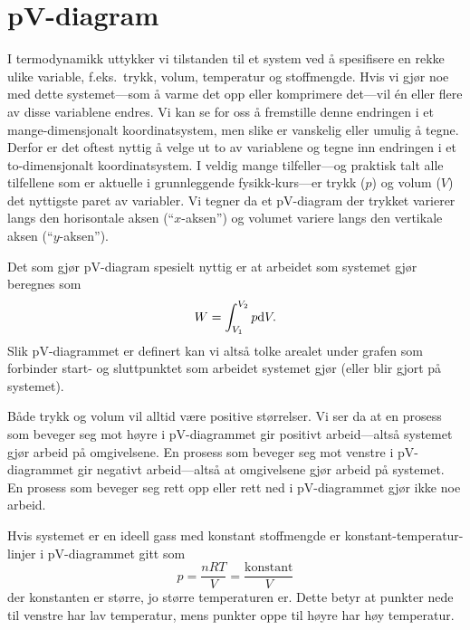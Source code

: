 \section{pV-diagram}
I termodynamikk uttykker vi tilstanden til et system ved å spesifisere en rekke ulike variable, f.eks.~trykk, volum, temperatur og stoffmengde. Hvis vi gjør noe med dette systemet---som å varme det opp eller komprimere det---vil \'en eller flere av disse variablene endres. Vi kan se for oss å fremstille denne endringen i et mange-dimensjonalt koordinatsystem, men slike er vanskelig eller umulig å tegne. Derfor er det oftest nyttig å velge ut to av variablene og tegne inn endringen i et to-dimensjonalt koordinatsystem. I veldig mange tilfeller---og praktisk talt alle tilfellene som er aktuelle i grunnleggende fysikk-kurs---er trykk ($p$) og volum ($V$) det nyttigste paret av variabler. Vi tegner da et pV-diagram der trykket varierer langs den horisontale aksen (``$x$-aksen'') og volumet variere langs den vertikale aksen (``$y$-aksen'').

Det som gjør pV-diagram spesielt nyttig er at arbeidet som systemet gjør beregnes som 
\begin{displaymath}
	W = \int_{V_1}^{V_2}p\mathrm{d} V.
\end{displaymath}
Slik pV-diagrammet er definert kan vi altså tolke arealet under grafen som forbinder start- og sluttpunktet som arbeidet systemet gjør (eller blir gjort på systemet). 

Både trykk og volum vil alltid være positive størrelser. Vi ser da at en prosess som beveger seg mot høyre i pV-diagrammet gir positivt arbeid---altså systemet gjør arbeid på omgivelsene. En prosess som beveger seg mot venstre i pV-diagrammet gir negativt arbeid---altså at omgivelsene gjør arbeid på systemet. En prosess som beveger seg rett opp eller rett ned i pV-diagrammet gjør ikke noe arbeid.

Hvis systemet er en ideell gass med konstant stoffmengde er konstant-temperatur-linjer i pV-diagrammet gitt som
\begin{displaymath}
	p = \frac{nRT}{V} = \frac{\text{konstant}}{V}
\end{displaymath}
der konstanten er større, jo større temperaturen er. Dette betyr at punkter nede til venstre har lav temperatur, mens punkter oppe til høyre har høy temperatur.